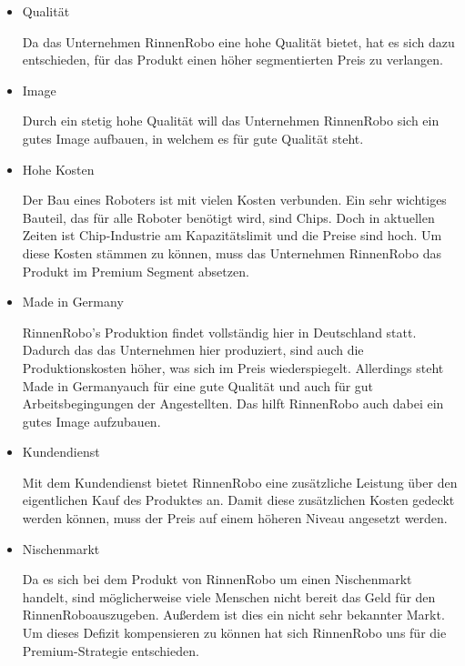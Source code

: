    \begin{itemize}
        \item Qualität
        
            Da das Unternehmen RinnenRobo eine hohe Qualität bietet, hat es sich dazu entschieden, für das Produkt einen
            höher segmentierten Preis zu verlangen.

        \item Image
        
            Durch ein stetig hohe Qualität will das Unternehmen RinnenRobo sich ein gutes Image aufbauen, in welchem es 
            für gute Qualität steht.

        \item Hohe Kosten

            Der Bau eines Roboters ist mit vielen Kosten verbunden. Ein sehr wichtiges Bauteil, das für alle Roboter
            benötigt wird, sind Chips. Doch in aktuellen Zeiten ist Chip-Industrie am Kapazitätslimit und die Preise
            sind hoch. Um diese Kosten stämmen zu können, muss das Unternehmen RinnenRobo das Produkt im Premium Segment
            absetzen.

        \item Made in Germany
        
            RinnenRobo's Produktion findet vollständig hier in Deutschland statt. Dadurch das das Unternehmen hier 
            produziert, sind auch die Produktionskosten höher, was sich im Preis wiederspiegelt. Allerdings steht 
            \as Made in Germany\adl auch für eine gute Qualität und auch für gut Arbeitsbegingungen der Angestellten.
            Das hilft RinnenRobo auch dabei ein gutes Image aufzubauen.

        \item Kundendienst
        
            Mit dem Kundendienst bietet RinnenRobo eine zusätzliche Leistung über den eigentlichen Kauf des Produktes
            an. Damit diese zusätzlichen Kosten gedeckt werden können, muss der Preis auf einem höheren Niveau 
            angesetzt werden.

        \item Nischenmarkt
        
            Da es sich bei dem Produkt von RinnenRobo um einen Nischenmarkt handelt, sind möglicherweise viele Menschen
            nicht bereit das Geld für den \as RinnenRobo\adl auszugeben. Außerdem ist dies ein nicht sehr bekannter 
            Markt. Um dieses Defizit kompensieren zu können hat sich RinnenRobo uns für die Premium-Strategie
            entschieden.
    \end{itemize}

